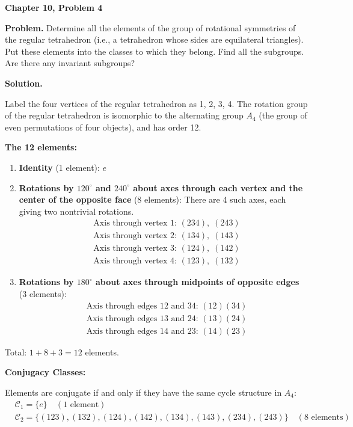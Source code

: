 \documentclass[12pt]{article}
\begin{document}
\begin{center}
{\Large\bfseries Chapter 10, Problem 4}
\end{center}

\noindent\textbf{Problem.} Determine all the elements of the group of rotational symmetries of the regular tetrahedron (i.e., a tetrahedron whose sides are equilateral triangles). Put these elements into the classes to which they belong. Find all the subgroups. Are there any invariant subgroups?

\bigskip
\noindent\textbf{Solution.}

Label the four vertices of the regular tetrahedron as 1, 2, 3, 4. The rotation group of the regular tetrahedron is isomorphic to the alternating group $A_4$ (the group of even permutations of four objects), and has order 12.

\medskip
\noindent\textbf{The 12 elements:}

\begin{enumerate}
\item \textbf{Identity} (1 element): $e$

\item \textbf{Rotations by $120^\circ$ and $240^\circ$ about axes through each vertex and the center of the opposite face} (8 elements): There are 4 such axes, each giving two nontrivial rotations.
\begin{align*}
&\text{Axis through vertex 1: } (234), \; (243) \\
&\text{Axis through vertex 2: } (134), \; (143) \\
&\text{Axis through vertex 3: } (124), \; (142) \\
&\text{Axis through vertex 4: } (123), \; (132)
\end{align*}

\item \textbf{Rotations by $180^\circ$ about axes through midpoints of opposite edges} (3 elements):
\begin{align*}
&\text{Axis through edges 12 and 34: } (12)(34) \\
&\text{Axis through edges 13 and 24: } (13)(24) \\
&\text{Axis through edges 14 and 23: } (14)(23)
\end{align*}
\end{enumerate}

Total: $1 + 8 + 3 = 12$ elements. \checkmark

\medskip
\noindent\textbf{Conjugacy Classes:}

Elements are conjugate if and only if they have the same cycle structure in $A_4$:
\begin{align*}
&\mathcal{C}_1 = \{e\} \quad (1 \text{ element}) \\
&\mathcal{C}_2 = \{(123), (132), (124), (142), (134), (143), (234), (243)\} \quad (8 \text{ elements})
\end{align*}
\end{document}
